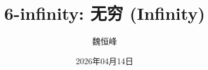 \documentclass[]{beamer}
\title[6-infinity: 无穷]{6-infinity: 无穷 (Infinity)}
\author[魏恒峰]{\large 魏恒峰}
\institute{hfwei@nju.edu.cn}
\date{2026年04月14日}
\begin{document}
\maketitle




% 

\thankyou{}

\end{document}
